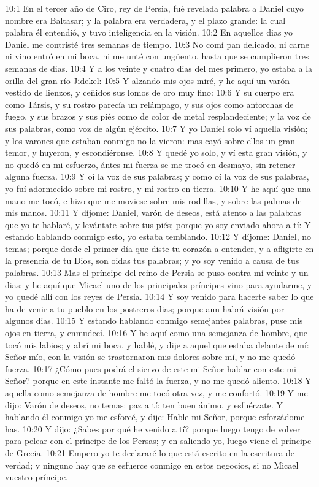 10:1 En el tercer año de Ciro, rey de Persia, fué revelada palabra a Daniel cuyo nombre era Baltasar; y la palabra era verdadera, y el plazo grande: la cual palabra él entendió, y tuvo inteligencia en la visión.
10:2 En aquellos dias yo Daniel me contristé tres semanas de tiempo.
10:3 No comí pan delicado, ni carne ni vino entró en mi boca, ni me unté con ungüento, hasta que se cumplieron tres semanas de dias.
10:4 Y a los veinte y cuatro dias del mes primero, yo estaba a la orilla del gran río Jidekel:
10:5 Y alzando mis ojos miré, y he aquí un varón vestido de lienzos, y ceñidos sus lomos de oro muy fino:
10:6 Y su cuerpo era como Társis, y su rostro parecía un relámpago, y sus ojos como antorchas de fuego, y sus brazos y sus piés como de color de metal resplandeciente; y la voz de sus palabras, como voz de algún ejército.
10:7 Y yo Daniel solo ví aquella visión; y los varones que estaban conmigo no la vieron: mas cayó sobre ellos un gran temor, y huyeron, y escondiéronse.
10:8 Y quedé yo solo, y ví esta gran visión, y no quedó en mi esfuerzo, ántes mi fuerza se me trocó en desmayo, sin retener alguna fuerza.
10:9 Y oí la voz de sus palabras; y como oí la voz de sus palabras, yo fuí adormecido sobre mi rostro, y mi rostro en tierra.
10:10 Y he aquí que una mano me tocó, e hizo que me moviese sobre mis rodillas, y sobre las palmas de mis manos.
10:11 Y díjome: Daniel, varón de deseos, está atento a las palabras que yo te hablaré, y levántate sobre tus piés; porque yo soy enviado ahora a tí: Y estando hablando conmigo esto, yo estaba temblando.
10:12 Y díjome: Daniel, no temas; porque desde el primer día que diste tu corazón a entender, y a afligirte en la presencia de tu Dios, son oidas tus palabras; y yo soy venido a causa de tus palabras.
10:13 Mas el príncipe del reino de Persia se puso contra mí veinte y un dias; y he aquí que Micael uno de los principales príncipes vino para ayudarme, y yo quedé allí con los reyes de Persia.
10:14 Y soy venido para hacerte saber lo que ha de venir a tu pueblo en los postreros dias; porque aun habrá visión por algunos dias.
10:15 Y estando hablando conmigo semejantes palabras, puse mis ojos en tierra, y enmudecí.
10:16 Y he aquí como una semejanza de hombre, que tocó mis labios; y abrí mi boca, y hablé, y dije a aquel que estaba delante de mí: Señor mío, con la visión se trastornaron mis dolores sobre mí, y no me quedó fuerza.
10:17 ¿Cómo pues podrá el siervo de este mi Señor hablar con este mi Señor? porque en este instante me faltó la fuerza, y no me quedó aliento.
10:18 Y aquella como semejanza de hombre me tocó otra vez, y me confortó.
10:19 Y me dijo: Varón de deseos, no temas: paz a tí: ten buen ánimo, y esfuérzate. Y hablando él conmigo yo me esforcé, y dije: Hable mi Señor, porque esforzádome has.
10:20 Y dijo: ¿Sabes por qué he venido a tí? porque luego tengo de volver para pelear con el príncipe de los Persas; y en saliendo yo, luego viene el príncipe de Grecia.
10:21 Empero yo te declararé lo que está escrito en la escritura de verdad; y ninguno hay que se esfuerce conmigo en estos negocios, si no Micael vuestro príncipe.

